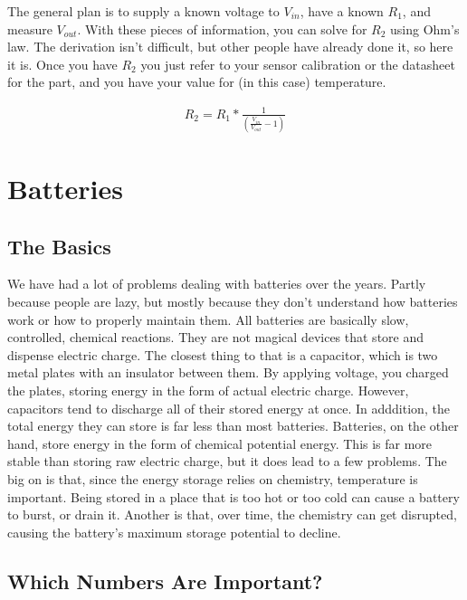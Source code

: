 The general plan is to supply a known voltage to $V_{in}$, have a known $R_1$, and measure $V_{out}$. With these pieces of information, you can solve for $R_2$ using Ohm's law. The derivation isn't difficult, but other people have already done it, so here it is. Once you have $R_2$ you just refer to your sensor calibration or the datasheet for the part, and you have your value for (in this case) temperature.

\begin{equation} \label{eqn:solveforr}
\begin{split}
R_2 = R_1*\frac{1}{(\frac{V_{in}}{V_{out}}-1)}
\end{split}
\end{equation}

\section{Batteries}
\label{sec:batteries}

\subsection{The Basics}

We have had a lot of problems dealing with batteries over the years. Partly because people are lazy, but mostly because they don't understand how batteries work or how to properly maintain them. All batteries are basically slow, controlled, chemical reactions. They are not magical devices that store and dispense electric charge. The closest thing to that is a capacitor, which is two metal plates with an insulator between them. By applying voltage, you charged the plates, storing energy in the form of actual electric charge. However, capacitors tend to discharge all of their stored energy at once. In adddition, the total energy they can store is far less than most batteries. Batteries, on the other hand, store energy in the form of chemical potential energy. This is far more stable than storing raw electric charge, but it does lead to a few problems. The big on is that, since the energy storage relies on chemistry, temperature is important. Being stored in a place that is too hot or too cold can cause a battery to burst, or drain it. Another is that, over time, the chemistry can get disrupted, causing the battery's maximum storage potential to decline.

\subsection{Which Numbers Are Important?}

